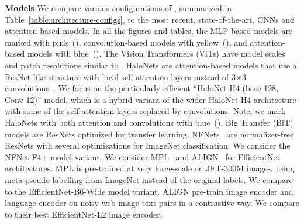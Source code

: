 {\bf Models\;\;}
We compare various configurations of \name{}, summarized in Table~\ref{table:architecture-configs}, to the most recent, state-of-the-art, CNNs and attention-based models.
In all the figures and tables, 
the MLP-based \name{} models are marked with pink~(\MDot{}),
convolution-based models with yellow~(\CDot{}), 
and attention-based models with blue~(\ADot{}).
The Vision Transformers (ViTs) have model scales and patch resolutions similar to \name{}.
HaloNets are attention-based models that use a ResNet-like structure with local self-attention layers instead of 3$\times$3 convolutions~\citep{vaswani2021scaling}.
We focus on the particularly efficient ``HaloNet-H4 (base 128, Conv-12)'' model, which is a hybrid variant of the wider HaloNet-H4 architecture with some of the self-attention layers replaced by convolutions.
Note, we mark HaloNets with both attention and convolutions with blue~(\ADot{}).
Big Transfer (BiT)~\citep{kolesnikov2020-bit} models are ResNets optimized for transfer learning.
NFNets~\citep{brock2021high} are normalizer-free ResNets with several optimizations for ImageNet classification.
We consider the NFNet-F4+ model variant.
We consider MPL~\citep{pham2020meta} and ALIGN~\citep{jia2021scaling} for EfficientNet architectures. MPL is pre-trained at very large-scale on JFT-300M images, using meta-pseudo labelling from ImageNet instead of the original labels. We compare to the EfficientNet-B6-Wide model variant. ALIGN pre-train image encoder and language encoder on noisy web image text pairs in a contrastive way. We compare to their best EfficientNet-L2 image encoder.

